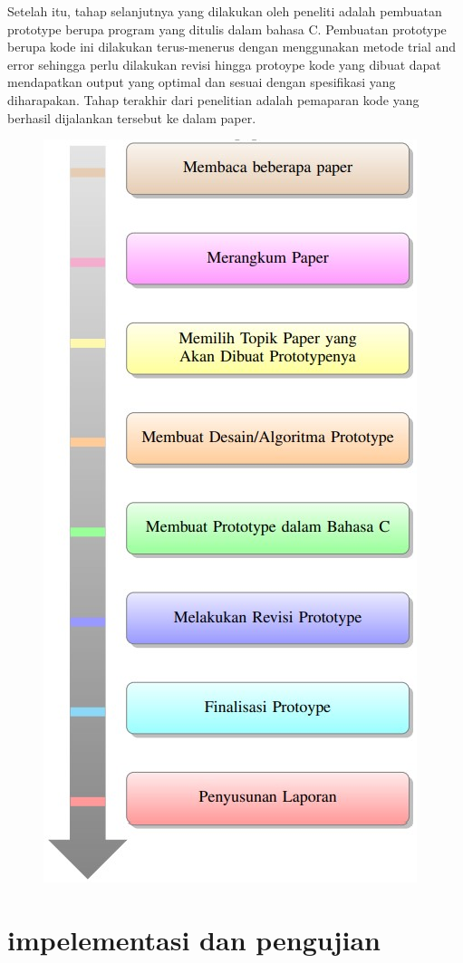 \documentclass[conference]{IEEEtran}
\begin{document}
	Setelah itu, tahap selanjutnya yang dilakukan oleh peneliti adalah pembuatan prototype berupa program yang ditulis dalam bahasa C. Pembuatan prototype berupa kode ini dilakukan terus-menerus dengan menggunakan metode trial and error sehingga perlu dilakukan revisi hingga protoype kode yang dibuat dapat mendapatkan output yang optimal dan sesuai dengan spesifikasi yang diharapakan. Tahap terakhir dari penelitian adalah pemaparan kode yang berhasil dijalankan tersebut ke dalam paper.
\begin{figure}[htbp]
\includegraphics[scale=0.75]{pic1}
\end{figure}
\newpage
\section{impelementasi dan pengujian}
\end{document}
